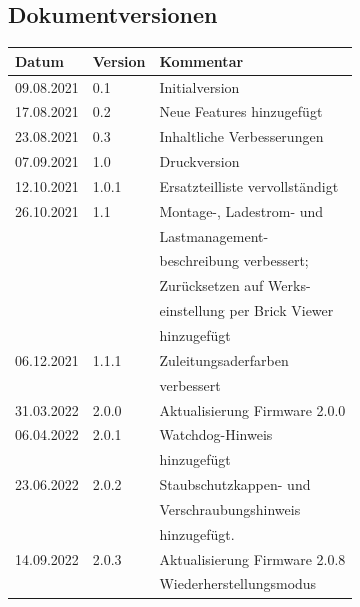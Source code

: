 \documentclass[a4paper,10pt]{article}
\begin{document}
\begin{multicols*}{2}
    \section{Dokumentversionen}
    \begin{tabular}{lll}
        \toprule
        Datum      & Version\hspace{-0.2pt} & Kommentar        \\
        \midrule
        09.08.2021 & 0.1     & Initialversion                  \\
        17.08.2021 & 0.2     & Neue Features hinzugefügt       \\
        23.08.2021 & 0.3     & Inhaltliche Verbesserungen      \\
        07.09.2021 & 1.0     & Druckversion                    \\
        12.10.2021 & 1.0.1   & Ersatzteilliste vervollständigt \\
        26.10.2021 & 1.1     & Montage-, Ladestrom- und        \\
                   &         & Lastmanagement-                 \\
                   &         & beschreibung verbessert;        \\
                   &         & Zurücksetzen auf Werks-         \\
                   &         & einstellung per Brick Viewer    \\
                   &         & hinzugefügt                     \\
        06.12.2021 & 1.1.1   & Zuleitungsaderfarben            \\
                   &         & verbessert                      \\
        31.03.2022 & 2.0.0   & Aktualisierung Firmware 2.0.0   \\
        06.04.2022 & 2.0.1   & Watchdog-Hinweis                \\
                   &         & hinzugefügt                     \\
        23.06.2022 & 2.0.2   & Staubschutzkappen- und          \\
                   &         & Verschraubungshinweis           \\
                   &         & hinzugefügt.                    \\
        14.09.2022 & 2.0.3   & Aktualisierung Firmware 2.0.8   \\
                   &         & Wiederherstellungsmodus         \\

\end{tabular}
\end{multicols*}
\end{document}
